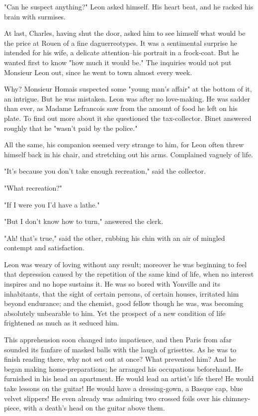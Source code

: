 \documentclass{tufte-book}
\begin{document}
"Can he suspect anything?" Leon asked himself. His heart beat, and he
racked his brain with surmises.

At last, Charles, having shut the door, asked him to see himself
what would be the price at Rouen of a fine daguerreotypes. It was a
sentimental surprise he intended for his wife, a delicate attention--his
portrait in a frock-coat. But he wanted first to know "how much it would
be." The inquiries would not put Monsieur Leon out, since he went to
town almost every week.

Why? Monsieur Homais suspected some "young man's affair" at the bottom
of it, an intrigue. But he was mistaken. Leon was after no love-making.
He was sadder than ever, as Madame Lefrancois saw from the amount of
food he left on his plate. To find out more about it she questioned
the tax-collector. Binet answered roughly that he "wasn't paid by the
police."

All the same, his companion seemed very strange to him, for Leon often
threw himself back in his chair, and stretching out his arms. Complained
vaguely of life.

"It's because you don't take enough recreation," said the collector.

"What recreation?"

"If I were you I'd have a lathe."

"But I don't know how to turn," answered the clerk.

"Ah! that's true," said the other, rubbing his chin with an air of
mingled contempt and satisfaction.

Leon was weary of loving without any result; moreover he was beginning
to feel that depression caused by the repetition of the same kind of
life, when no interest inspires and no hope sustains it. He was so bored
with Yonville and its inhabitants, that the sight of certain persons,
of certain houses, irritated him beyond endurance; and the chemist, good
fellow though he was, was becoming absolutely unbearable to him. Yet
the prospect of a new condition of life frightened as much as it seduced
him.

This apprehension soon changed into impatience, and then Paris from afar
sounded its fanfare of masked balls with the laugh of grisettes. As he
was to finish reading there, why not set out at once? What prevented
him? And he began making home-preparations; he arranged his occupations
beforehand. He furnished in his head an apartment. He would lead an
artist's life there! He would take lessons on the guitar! He would have
a dressing-gown, a Basque cap, blue velvet slippers! He even already was
admiring two crossed foils over his chimney-piece, with a death's head
on the guitar above them.
\end{document}
